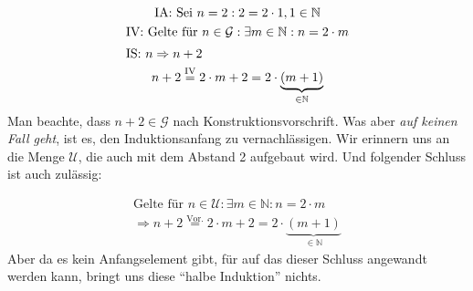 \documentclass{article}
\begin{document}
\begin{gather*}
  \text{IA: Sei } n = 2: 2 = 2 \cdot 1, 1 \in \mathbb{N}\\
  \text{IV: Gelte für } n \in \mathcal{G} : \exists m \in \mathbb{N} : n = 2 \cdot m\\
  \intertext{IS: $n \Rightarrow n + 2$}
  n + 2 \overset{\text{IV}}= 2 \cdot m + 2 = 2 \cdot \underbrace{(m + 1)}_{\in \mathbb{N}}
\end{gather*}
Man beachte, dass $n + 2 \in \mathcal{G}$ nach Konstruktionsvorschrift. Was aber \emph{auf keinen Fall geht}, ist es, den Induktionsanfang zu vernachlässigen. Wir erinnern uns an die Menge $\mathcal{U}$, die auch mit dem Abstand 2 aufgebaut wird. Und folgender Schluss ist auch zulässig:

\begin{gather*}
  \text{Gelte für } n \in \mathcal{U} : \exists m \in \mathbb{N} : n = 2 \cdot m\\
  \Rightarrow n + 2 \overset{\text{Vor.}}= 2 \cdot m + 2 = 2 \cdot \underbrace{(m + 1)}_{\in \mathbb{N}}
\end{gather*}
Aber da es kein Anfangselement gibt, für auf das dieser Schluss angewandt werden kann, bringt uns diese "`halbe Induktion"' nichts.
\end{document}
